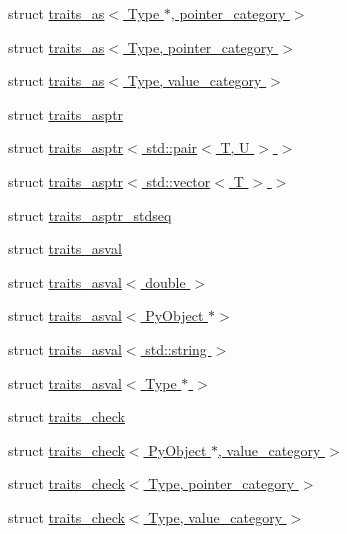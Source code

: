 \begin{DoxyCompactItemize}
\item 
struct \hyperlink{structswig_1_1traits__as_3_01_type_01_5_00_01pointer__category_01_4}{traits\+\_\+as$<$ Type $\ast$, pointer\+\_\+category $>$}
\item 
struct \hyperlink{structswig_1_1traits__as_3_01_type_00_01pointer__category_01_4}{traits\+\_\+as$<$ Type, pointer\+\_\+category $>$}
\item 
struct \hyperlink{structswig_1_1traits__as_3_01_type_00_01value__category_01_4}{traits\+\_\+as$<$ Type, value\+\_\+category $>$}
\item 
struct \hyperlink{structswig_1_1traits__asptr}{traits\+\_\+asptr}
\item 
struct \hyperlink{structswig_1_1traits__asptr_3_01std_1_1pair_3_01_t_00_01_u_01_4_01_4}{traits\+\_\+asptr$<$ std\+::pair$<$ T, U $>$ $>$}
\item 
struct \hyperlink{structswig_1_1traits__asptr_3_01std_1_1vector_3_01_t_01_4_01_4}{traits\+\_\+asptr$<$ std\+::vector$<$ T $>$ $>$}
\item 
struct \hyperlink{structswig_1_1traits__asptr__stdseq}{traits\+\_\+asptr\+\_\+stdseq}
\item 
struct \hyperlink{structswig_1_1traits__asval}{traits\+\_\+asval}
\item 
struct \hyperlink{structswig_1_1traits__asval_3_01double_01_4}{traits\+\_\+asval$<$ double $>$}
\item 
struct \hyperlink{structswig_1_1traits__asval_3_01_py_object_01_5_4}{traits\+\_\+asval$<$ Py\+Object $\ast$$>$}
\item 
struct \hyperlink{structswig_1_1traits__asval_3_01std_1_1string_01_4}{traits\+\_\+asval$<$ std\+::string $>$}
\item 
struct \hyperlink{structswig_1_1traits__asval_3_01_type_01_5_01_4}{traits\+\_\+asval$<$ Type $\ast$ $>$}
\item 
struct \hyperlink{structswig_1_1traits__check}{traits\+\_\+check}
\item 
struct \hyperlink{structswig_1_1traits__check_3_01_py_object_01_5_00_01value__category_01_4}{traits\+\_\+check$<$ Py\+Object $\ast$, value\+\_\+category $>$}
\item 
struct \hyperlink{structswig_1_1traits__check_3_01_type_00_01pointer__category_01_4}{traits\+\_\+check$<$ Type, pointer\+\_\+category $>$}
\item 
struct \hyperlink{structswig_1_1traits__check_3_01_type_00_01value__category_01_4}{traits\+\_\+check$<$ Type, value\+\_\+category $>$}
\item 

\end{DoxyCompactItemize}
